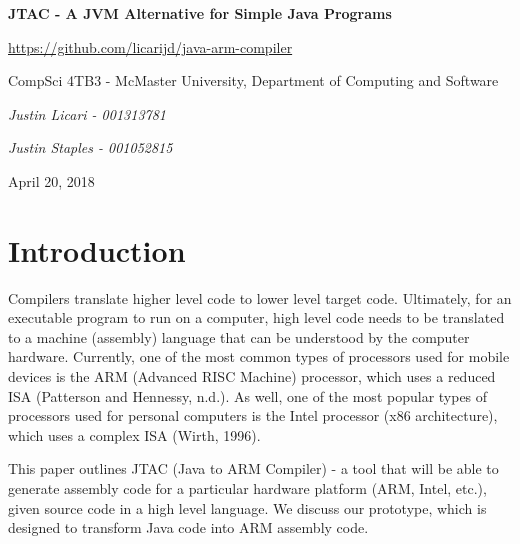 \documentclass[11pt]{article}
\begin{document}
\begin{titlepage}
   \begin{center}
      \huge\textbf{JTAC - A JVM Alternative for Simple Java Programs}

      \bigskip
	  \small{\url{https://github.com/licarijd/java-arm-compiler}}

      \bigskip
      \Large CompSci 4TB3 - McMaster University, Department of Computing and Software

      \bigskip
      \bigskip
      \large \textit{Justin Licari - 001313781}

      \large \textit{Justin Staples - 001052815}

      \bigskip
      \bigskip
      \large April 20, 2018
   \end{center}

\end{titlepage}

\newpage

\tableofcontents

\thispagestyle{empty}

\newpage

\setcounter{page}{1}

\section{Introduction}

\justifying
Compilers translate higher level code to lower level target code. Ultimately, for an executable program to run on a computer, high level code needs to be translated to a machine (assembly) language that can be understood by the computer hardware. Currently, one of the most common types of processors used for mobile devices is the ARM (Advanced RISC Machine) processor, which uses a reduced ISA (Patterson and Hennessy, n.d.). As well, one of the most popular types of processors used for personal computers is the Intel processor (x86 architecture), which uses a complex ISA (Wirth, 1996). 

\bigskip
This paper outlines JTAC (Java to ARM Compiler) - a tool that will be able to generate assembly code for a particular hardware platform (ARM, Intel, etc.), given source code in a high level language. We discuss our prototype, which is designed to transform Java code into ARM assembly code.
\end{document}
